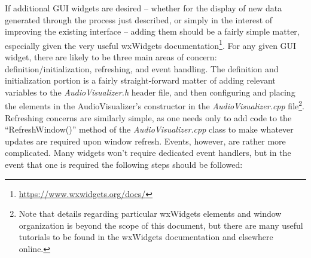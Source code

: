 \documentclass[12pt]{report}
\begin{document}
\indent If additional GUI widgets are desired -- whether for the display of new data generated through the process just described, or simply in the interest of improving the existing interface -- adding them should be a fairly simple matter, especially given the very useful wxWidgets documentation\footnote{\url{https://www.wxwidgets.org/docs/}}. For any given GUI widget, there are likely to be three main areas of concern: definition/initialization, refreshing, and event handling. The definition and initialization portion is a fairly straight-forward matter of adding relevant variables to the \emph{AudioVisualizer.h} header file, and then configuring and placing the elements in the AudioVisualizer's constructor in the \emph{AudioVisualizer.cpp} file\footnote{Note that details regarding particular wxWidgets elements and window organization is beyond the scope of this document, but there are many useful tutorials to be found in the wxWidgets documentation and elsewhere online.}. Refreshing concerns are similarly simple, as one needs only to add code to the ``RefreshWindow()'' method of the \emph{AudioVisualizer.cpp} class to make whatever updates are required upon window refresh. Events, however, are rather more complicated. Many widgets won't require dedicated event handlers, but in the event that one is required the following steps should be followed:
\end{document}
